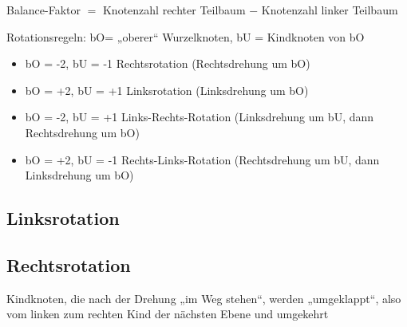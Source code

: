 \documentclass{lehramt-informatik-haupt}
\begin{document}
\begin{center}
Balance-Faktor $=$ Knotenzahl rechter Teilbaum $-$ Knotenzahl linker Teilbaum
\end{center}

Rotationsregeln:
bO= „oberer“ Wurzelknoten, bU = Kindknoten von bO

\begin{itemize}
\item bO = -2, bU = -1  Rechtsrotation (Rechtsdrehung um bO)
\item bO = +2, bU = +1  Linksrotation (Linksdrehung um bO)
\item bO = -2, bU = +1  Links-Rechts-Rotation (Linksdrehung um bU, dann Rechtsdrehung um bO)
\item bO = +2, bU = -1  Rechts-Links-Rotation (Rechtsdrehung um bU, dann Linksdrehung um bO)
\end{itemize}

%

\subsection{Linksrotation}


%

\subsection{Rechtsrotation}


Kindknoten, die nach der Drehung „im Weg stehen“, werden „umgeklappt“,
also vom linken zum rechten Kind der nächsten Ebene und umgekehrt

\literatur
\end{document}
